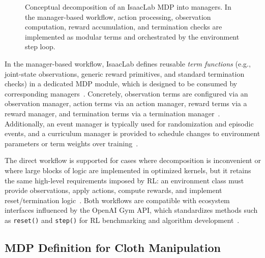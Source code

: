 \begin{figure}[ht!]
\centering
{}
\caption[IsaacLab manager-based MDP decomposition]{Conceptual decomposition of an IsaacLab \ac{MDP} into managers. In the manager-based workflow, action processing, observation computation, reward accumulation, and termination checks are implemented as modular terms and orchestrated by the environment step loop.}\label{fig:isaaclab_manager_based_mdp_workflow}
\end{figure}

In the manager-based workflow, IsaacLab defines reusable \emph{term functions} (e.g., joint-state observations, generic reward primitives, and standard termination checks) in a dedicated \ac{MDP} module, which is designed to be consumed by corresponding managers~\cite{isaaclab_mdp_terms_api,isaaclab_managers_api}. Concretely, observation terms are configured via an observation manager, action terms via an action manager, reward terms via a reward manager, and termination terms via a termination manager~\cite{isaaclab_mdp_terms_api,isaaclab_managers_api}. Additionally, an event manager is typically used for randomization and episodic events, and a curriculum manager is provided to schedule changes to environment parameters or term weights over training~\cite{isaaclab_mdp_terms_api,isaaclab_managers_api}.

The direct workflow is supported for cases where decomposition is inconvenient or where large blocks of logic are implemented in optimized kernels, but it retains the same high-level requirements imposed by \ac{RL}: an environment class must provide observations, apply actions, compute rewards, and implement reset/termination logic~\cite{isaaclab_task_design_workflows,isaaclab_envs_api}. Both workflows are compatible with ecosystem interfaces influenced by the OpenAI Gym API, which standardizes methods such as \texttt{reset()} and \texttt{step()} for \ac{RL} benchmarking and algorithm development~\cite{Brockman2016OpenAIGym,isaaclab_wrap_env}.

\subsection{MDP Definition for Cloth Manipulation}

